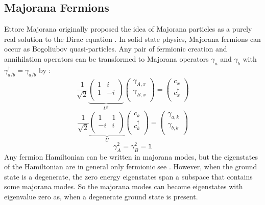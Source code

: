 \documentclass[Master]{subfiles}
\begin{document}
\subsection{Majorana Fermions}
Ettore Majorana originally proposed the idea of Majorana particles as a purely real solution to the Dirac equation \cite{majorana1937teoria}. In solid state physics, Majorana fermions can occur as Bogoliubov quasi-particles. Any pair of fermionic creation and annihilation operators can be transformed to Majorana operators $\gamma_a$ and $\gamma_b$ with $\gamma_{a/b}^{\dag}=\gamma_{a/b}$ by :
$$
\frac{1}{\sqrt{2}} 
\underbrace{\left(\begin{array}{cc}
 1 & i \\
 1 & -i \\
\end{array}
\right)}_{U^{\dag}}
 \left(
\begin{array}{c}
 \gamma _{A,x} \\
 \gamma _{B,x} \\
\end{array}
\right)=\left(
\begin{array}{c}
 c_x \\
 c_x^{\dagger } \\
\end{array}
\right)
$$
$$
\frac{1}{\sqrt{2}} 
\underbrace{\left(
\begin{array}{cc}
 1 & 1 \\
 -i & i \\
\end{array}
\right)}_{U} \left(
\begin{array}{c}
 c_k \\
c_k^{\dagger } \\
\end{array}
\right)=\left(
\begin{array}{c}
 \gamma _{a,k} \\
 \gamma _{b,k} \\
\end{array}
\right)
$$
$$\gamma_{A}^2 = \gamma_{B}^2 = \mathbb{1}$$
Any fermion Hamiltonian can be written in majorana modes, but the eigenstates of the Hamiltonian are in general only fermionic see . However, when the ground state is a degenerate, the zero energy eigenstates span a subspace that contains some majorana modes. So the majorana modes can become eigenstates with eigenvalue zero as, when a degenerate ground state is present.
\end{document}

